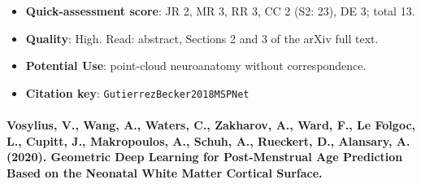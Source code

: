 \documentclass[journal,onecolumn]{IEEEtran}
\begin{document}
\begin{itemize}
\item{} \textbf{Quick-assessment score}: JR 2, MR 3, RR 3, CC 2 (S2: 23), DE 3; total 13.

\item{} \textbf{Quality}: High. Read: abstract, Sections 2 and 3 of the arXiv full text.

\item{} \textbf{Potential Use}: point-cloud neuroanatomy without correspondence.

\item{} \textbf{Citation key}: \texttt{GutierrezBecker2018MSPNet}

\end{itemize}

\paragraph{Vosylius, V., Wang, A., Waters, C., Zakharov, A., Ward, F., Le Folgoc, L., Cupitt, J., Makropoulos, A., Schuh, A., Rueckert, D., Alansary, A. (2020). Geometric Deep Learning for Post-Menstrual Age Prediction Based on the Neonatal White Matter Cortical Surface.~\cite{Vosylius2020NeonatalSurface}}\mbox{}
\end{document}
